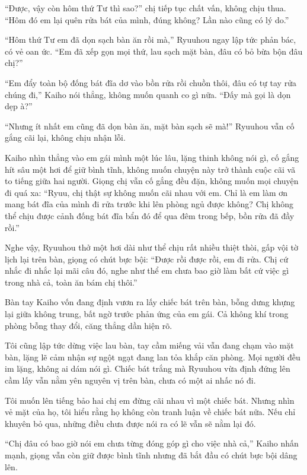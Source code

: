\documentclass[../main.tex]{subfiles}
\begin{document}
``Được, vậy còn hôm thứ Tư thì sao?'' chị tiếp tục chất vấn, không chịu thua. ``Hôm đó em lại quên rửa bát của mình, đúng không? Lần nào cũng có lý do.''

``Hôm thứ Tư em đã dọn sạch bàn ăn rồi mà,'' Ryuuhou ngay lập tức phản bác, có vẻ oan ức. ``Em đã xếp gọn mọi thứ, lau sạch mặt bàn, đâu có bỏ bừa bộn đâu chị?''

``Em đẩy toàn bộ đống bát đĩa dơ vào bồn rửa rồi chuồn thôi, đâu có tự tay rửa chúng đi,'' Kaiho nói thẳng, không muốn quanh co gì nữa. ``Đấy mà gọi là dọn dẹp à?''

``Nhưng ít nhất em cũng đã dọn bàn ăn, mặt bàn sạch sẽ mà!'' Ryuuhou vẫn cố gắng cãi lại, không chịu nhận lỗi.

Kaiho nhìn thẳng vào em gái mình một lúc lâu, lặng thinh không nói gì, cố gắng hít sâu một hơi để giữ bình tĩnh, không muốn chuyện này trở thành cuộc cãi vã to tiếng giữa hai người. Giọng chị vẫn cố gắng đều đặn, không muốn mọi chuyện đi quá xa: ``Ryuu, chị thật sự không muốn cãi nhau với em. Chỉ là em làm ơn mang bát đĩa của mình đi rửa trước khi lên phòng ngủ được không? Chị không thể chịu được cảnh đống bát đĩa bẩn đó để qua đêm trong bếp, bồn rửa đã đầy rồi.''

Nghe vậy, Ryuuhou thở một hơi dài như thể chịu rất nhiều thiệt thòi, gấp vội tờ lịch lại trên bàn, giọng có chút bực bội: ``Được rồi được rồi, em đi rửa. Chị cứ nhắc đi nhắc lại mãi câu đó, nghe như thể em chưa bao giờ làm bất cứ việc gì trong nhà cả, toàn ăn bám chị thôi.''

Bàn tay Kaiho vốn đang định vươn ra lấy chiếc bát trên bàn, bỗng dưng khựng lại giữa không trung, bất ngờ trước phản ứng của em gái. Cả không khí trong phòng bỗng thay đổi, căng thẳng dần hiện rõ.

Tôi cũng lập tức dừng việc lau bàn, tay cầm miếng vải vẫn đang chạm vào mặt bàn, lặng lẽ cảm nhận sự ngột ngạt đang lan tỏa khắp căn phòng. Mọi người đều im lặng, không ai dám nói gì. Chiếc bát trắng mà Ryuuhou vừa định đứng lên cầm lấy vẫn nằm yên nguyên vị trên bàn, chưa có một ai nhấc nó đi.

Tôi muốn lên tiếng bảo hai chị em đừng cãi nhau vì một chiếc bát. Nhưng nhìn vẻ mặt của họ, tôi hiểu rằng họ không còn tranh luận về chiếc bát nữa. Nếu chỉ khuyên bỏ qua, những điều chưa được nói ra có lẽ vẫn sẽ nằm lại đó.

``Chị đâu có bao giờ nói em chưa từng đóng góp gì cho việc nhà cả,'' Kaiho nhấn mạnh, giọng vẫn còn giữ được bình tĩnh nhưng đã bắt đầu có chút bực bội dâng lên.
\end{document}
